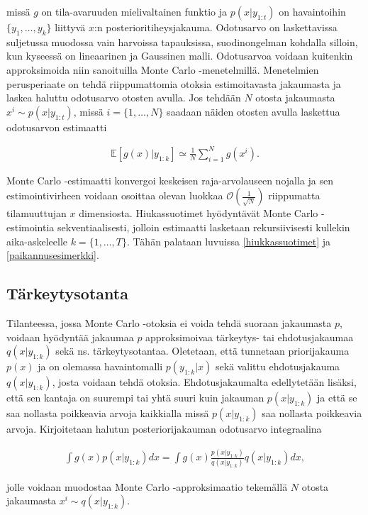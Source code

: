 \documentclass[
  12pt,
  a4paper, twoside]{book}
\begin{document}
\noindent missä \(g\) on tila-avaruuden mielivaltainen funktio ja \(p(x|y_{1:t})\) on havaintoihin \(\{y_1,\ldots,y_k\}\) liittyvä \(x\):n posterioritiheysjakauma. Odotusarvo on laskettavissa suljetussa muodossa vain harvoissa tapauksissa, suodinongelman kohdalla silloin, kun kyseessä on lineaarinen ja Gaussinen malli. Odotusarvoa voidaan kuitenkin approksimoida niin sanoituilla Monte Carlo -menetelmillä. Menetelmien perusperiaate on tehdä riippumattomia otoksia estimoitavasta jakaumasta ja laskea haluttu odotusarvo otosten avulla. Jos tehdään \(N\) otosta jakaumasta \(x^i\sim p(x|y_{1:t})\), missä \(i=\{1,\ldots,N\}\) saadaan näiden otosten avulla laskettua odotusarvon estimaatti

\begin{align}
\mathbb{E}[g(x)|y_{1:k}]\simeq\frac{1}{N}\sum_{i=1}^N g(x^i).
\end{align}

Monte Carlo -estimaatti konvergoi keskeisen raja-arvolauseen nojalla ja sen estimointivirheen voidaan osoittaa olevan luokkaa \(\mathcal{O}(\frac{1}{\sqrt{N}})\) riippumatta tilamuuttujan \(x\) dimensiosta. Hiukassuotimet hyödyntävät Monte Carlo -estimointia sekventiaalisesti, jolloin estimaatti lasketaan rekursiivisesti kullekin aika-askeleelle \(k=\{1,\ldots, T\}\). Tähän palataan luvuissa \ref{hiukkassuotimet} ja \ref{paikannusesimerkki}.

\subsection{Tärkeytysotanta}

Tilanteessa, jossa Monte Carlo -otoksia ei voida tehdä suoraan jakaumasta \(p\), voidaan hyödyntää jakaumaa \(p\) approksimoivaa tärkeytys- tai ehdotusjakaumaa \(q(x|y_{1:k})\) sekä ns. tärkeytysotantaa. Oletetaan, että tunnetaan priorijakauma \(p(x)\) ja on olemassa havaintomalli \(p(y_{1:k}|x)\) sekä valittu ehdotusjakauma \(q(x|y_{1:k})\), josta voidaan tehdä otoksia. Ehdotusjakaumalta edellytetään lisäksi, että sen kantaja on suurempi tai yhtä suuri kuin jakauman \(p(x|y_{1:k})\) ja että se saa nollasta poikkeavia arvoja kaikkialla missä \(p(x|y_{1:k})\) saa nollasta poikkeavia arvoja. Kirjoitetaan halutun posteriorijakauman odotusarvo integraalina

\begin{align}
\int g(x)p(x|y_{1:k})dx=\int g(x)\frac{p(x|y_{1:k})}{q(x|y_{1:k})}q(x|y_{1:k})dx,
\end{align}

\noindent jolle voidaan muodostaa Monte Carlo -approksimaatio tekemällä \(N\) otosta jakaumasta \(x^i \sim q(x|y_{1:k})\).
\end{document}
